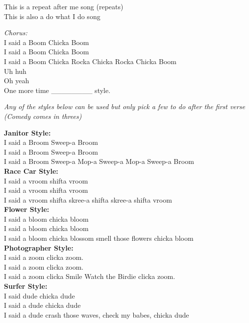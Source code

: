 
This is a repeat after me song (repeats) \\
This is also a do what I do song

\begin{center}
\textit{Chorus:} \\
I said a Boom Chicka Boom \\
I said a Boom Chicka Boom \\
I said a Boom Chicka Rocka Chicka Rocka Chicka Boom \\
Uh huh \\
Oh yeah \\
One more time \_\_\_\_\_\_\_\_ style. \\
\end{center}

\textit{Any of the styles below can be used but only pick a few to do after the first verse (Comedy comes in threes)}

\textbf{Janitor Style:} \\
I said a Broom Sweep-a Broom \\
I said a Broom Sweep-a Broom \\
I said a Broom Sweep-a Mop-a Sweep-a Mop-a Sweep-a Broom \\

\textbf{Race Car Style:} \\
I said a vroom shifta vroom \\
I said a vroom shifta vroom \\
I said a vroom shifta skree-a shifta skree-a shifta vroom \\

\textbf{Flower Style:} \\
I said a bloom chicka bloom \\
I said a bloom chicka bloom \\
I said a bloom chicka blossom smell those flowers chicka bloom \\

\textbf{Photographer Style:} \\
I said a zoom clicka zoom. \\
I said a zoom clicka zoom. \\
I said a zoom clicka Smile Watch the Birdie clicka zoom. \\

\textbf{Surfer Style:} \\
I said dude chicka dude \\
I said a dude chicka dude \\
I said a dude crash those waves, check my babes, chicka dude \\

